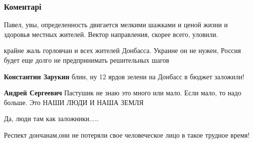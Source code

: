  
 
 
 
 
\subsubsection{Коментарі}
\label{sec:01_10_2021.fb.kuharkin_pavel.1.gorlovka.cmt}

\begin{itemize} %
Павел, увы, определенность двигается мелкими шажками и ценой жизни и здоровья местных жителей. Вектор направления, скорее всего, уловили.

крайне жаль горловчан и всех жителей Донбасса. Украине он не нужен, Россия будет еще долго не предпринимать решительных шагов

\begin{itemize} %
\textbf{Константин Зарукин} блин, ну 12 ярдов зелени на Донбасс в бюджет заложили!

\textbf{Андрей Сергеевич} Пастушик не знаю это много или мало. Если мало, то надо больше. Это НАШИ ЛЮДИ И НАША ЗЕМЛЯ
\end{itemize} %

Да, люди там как заложники.....

Респект дончанам,они не потеряли свое человеческое лицо в такое трудное время!
\end{itemize} %
